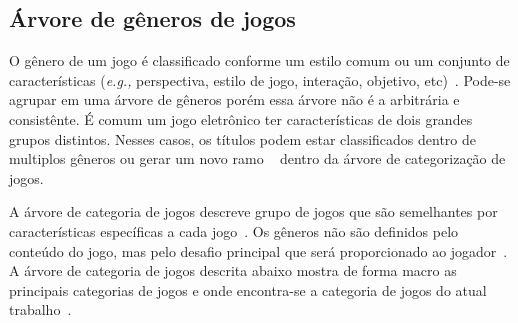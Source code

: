\subsection{Árvore de gêneros de jogos}
\label{sec:arvore_de_generos_de_jogos}



O gênero de um jogo é classificado conforme um estilo comum ou um conjunto de características (\textit{e.g.,} perspectiva, estilo de jogo, interação, objetivo, etc)~\cite{video_game_technologies}.
%
Pode-se agrupar em uma árvore de gêneros porém essa árvore não é a arbitrária e consistênte.
%
É comum um jogo eletrônico ter características de dois grandes grupos distintos.
%
Nesses casos, os títulos podem estar classificados dentro de multiplos gêneros ou gerar um novo ramo ~\cite{video_game_technologies} dentro da árvore de categorização de jogos.



A árvore de categoria de jogos descreve grupo de jogos que são semelhantes por características específicas a cada jogo~\cite{video_game_technologies, Adams2014Jan}.
%
Os gêneros não são definidos pelo conteúdo do jogo, mas pelo desafio principal que será proporcionado ao jogador~\cite{Adams2014Jan}.
%
A árvore de categoria de jogos descrita abaixo mostra de forma macro as principais categorias de jogos e onde encontra-se a categoria de jogos do atual trabalho~\cite{video_game_technologies}.



